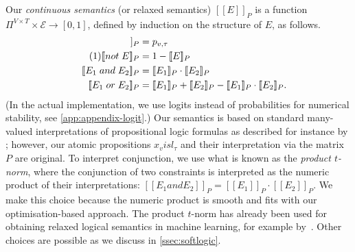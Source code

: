\documentclass[acmsmall, review, anonymous]{acmart}\settopmatter{printfolios=true,printccs=false,printacmref=false}
\newcommand{\qqpi}[2]{[\![#2]\!]_{#1}}
\newcommand\numberthis{\addtocounter{equation}{1}\tag{\theequation}}
\newcommand{\margincomment}[2]{\marginpar{\scriptsize\color{Maroon}#1 says: #2}}
\newcommand{\ivp}[1]{\margincomment{IVP}{#1}}
\begin{document}
%
Our \emph{continuous semantics} (or relaxed semantics) $\qqpi{P}{E}$ is a function $\Pi^{V \times T} \times \mathcal{E} \rightarrow [0, 1]$,
defined by induction on the structure of $E$, as follows.
\begin{align*}
	\qqpi{P}{x_v \mathrel{is} l_\tau} & = p_{v,\tau}                        \\  \numberthis \label{eq:logical}
	\qqpi{P}{\mathrel{not} E}         & = 1-\qqpi{P}{E}                     \\
	\qqpi{P}{E_1 \mathrel{and} E_2}   & = \qqpi{P}{E_1} \cdot \qqpi{P}{E_2} \\
	\qqpi{P}{E_1 \mathrel{or} E_2}    & =
	\qqpi{P}{E_1} + \qqpi{P}{E_2} - \qqpi{P}{E_1}\cdot\qqpi{P}{E_2}.
\end{align*}
(In the actual implementation, we use logits instead of probabilities
for numerical stability, see \cref{app:appendix-logit}.)
%
Our semantics is based on standard many-valued interpretations of propositional logic formulas as described for instance by \citet{hajek98}; however, our atomic propositions $x_v \mathrel{is} l_\tau$ and their interpretation via the matrix $P$ are original.
%
To interpret conjunction, we use what is known as the \emph{product $t$-norm}, where the conjunction of two constraints is interpreted as the numeric product of their interpretations:
$\qqpi{P}{E_1 \mathrel{and} E_2} = \qqpi{P}{E_1} \cdot \qqpi{P}{E_2}$.
%
We make this choice because the numeric product is smooth and fits with our optimisation-based approach.
%
The product $t$-norm has already been used for obtaining relaxed logical semantics in machine learning, for example by~\citet{rocktaschel15}.
%
Other choices are possible as we discuss in \autoref{ssec:softlogic}.

\end{document}
